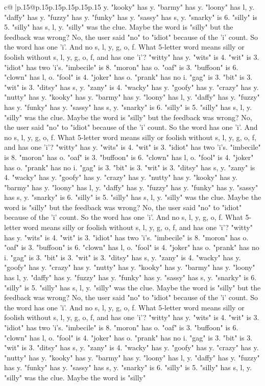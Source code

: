 \documentclass{article}
\begin{document}
{\begin{supertabular}{c@{$\;$}|p{.15\linewidth}@{}p{.15\linewidth}p{.15\linewidth}p{.15\linewidth}p{.15\linewidth}p{.15\linewidth}}
{{{y. "kooky" has y. "barmy" has y. "loony" has l, y. "daffy" has y. "fuzzy" has y. "funky" has y. "sassy" has s, y. "snarky" is 6. "silly" is 5. "silly" has s, l, y. "silly" was the clue. Maybe the word is "silly" but the feedback was wrong? No, the user said "no" to "idiot" because of the 'i' count. So the word has one 'i'. And no s, l, y, g, o, f. What 5{-}letter word means silly or foolish without s, l, y, g, o, f, and has one 'i'? "witty" has y. "wits" is 4. "wit" is 3. "idiot" has two 'i's. "imbecile" is 8. "moron" has o. "oaf" is 3. "buffoon" is 6. "clown" has l, o. "fool" is 4. "joker" has o. "prank" has no i. "gag" is 3. "bit" is 3. "wit" is 3. "ditsy" has s, y. "zany" is 4. "wacky" has y. "goofy" has y. "crazy" has y. "nutty" has y. "kooky" has y. "barmy" has y. "loony" has l, y. "daffy" has y. "fuzzy" has y. "funky" has y. "sassy" has s, y. "snarky" is 6. "silly" is 5. "silly" has s, l, y. "silly" was the clue. Maybe the word is "silly" but the feedback was wrong? No, the user said "no" to "idiot" because of the 'i' count. So the word has one 'i'. And no s, l, y, g, o, f. What 5{-}letter word means silly or foolish without s, l, y, g, o, f, and has one 'i'? "witty" has y. "wits" is 4. "wit" is 3. "idiot" has two 'i's. "imbecile" is 8. "moron" has o. "oaf" is 3. "buffoon" is 6. "clown" has l, o. "fool" is 4. "joker" has o. "prank" has no i. "gag" is 3. "bit" is 3. "wit" is 3. "ditsy" has s, y. "zany" is 4. "wacky" has y. "goofy" has y. "crazy" has y. "nutty" has y. "kooky" has y. "barmy" has y. "loony" has l, y. "daffy" has y. "fuzzy" has y. "funky" has y. "sassy" has s, y. "snarky" is 6. "silly" is 5. "silly" has s, l, y. "silly" was the clue. Maybe the word is "silly" but the feedback was wrong? No, the user said "no" to "idiot" because of the 'i' count. So the word has one 'i'. And no s, l, y, g, o, f. What 5{-}letter word means silly or foolish without s, l, y, g, o, f, and has one 'i'? "witty" has y. "wits" is 4. "wit" is 3. "idiot" has two 'i's. "imbecile" is 8. "moron" has o. "oaf" is 3. "buffoon" is 6. "clown" has l, o. "fool" is 4. "joker" has o. "prank" has no i. "gag" is 3. "bit" is 3. "wit" is 3. "ditsy" has s, y. "zany" is 4. "wacky" has y. "goofy" has y. "crazy" has y. "nutty" has y. "kooky" has y. "barmy" has y. "loony" has l, y. "daffy" has y. "fuzzy" has y. "funky" has y. "sassy" has s, y. "snarky" is 6. "silly" is 5. "silly" has s, l, y. "silly" was the clue. Maybe the word is "silly" but the feedback was wrong? No, the user said "no" to "idiot" because of the 'i' count. So the word has one 'i'. And no s, l, y, g, o, f. What 5{-}letter word means silly or foolish without s, l, y, g, o, f, and has one 'i'? "witty" has y. "wits" is 4. "wit" is 3. "idiot" has two 'i's. "imbecile" is 8. "moron" has o. "oaf" is 3. "buffoon" is 6. "clown" has l, o. "fool" is 4. "joker" has o. "prank" has no i. "gag" is 3. "bit" is 3. "wit" is 3. "ditsy" has s, y. "zany" is 4. "wacky" has y. "goofy" has y. "crazy" has y. "nutty" has y. "kooky" has y. "barmy" has y. "loony" has l, y. "daffy" has y. "fuzzy" has y. "funky" has y. "sassy" has s, y. "snarky" is 6. "silly" is 5. "silly" has s, l, y. "silly" was the clue. Maybe the word is "silly" }}}
\end{supertabular}}
\end{document}
